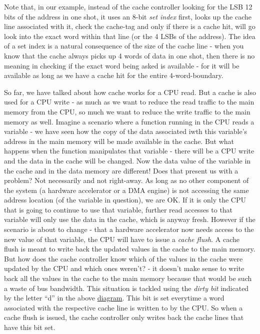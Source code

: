 Note that, in our example, instead of the cache controller looking for the LSB 12 bits of the address in one shot, it uses an 8-bit \emph{set index} first, looks up the cache line associated with it, check the cache-tag and only if there is a cache hit, will go look into the exact word within that line (or the 4 LSBs of the address). The idea of a set index is a natural consequence of the size of the cache line - when you know that the cache always picks up 4 words of data in one shot, then there is no meaning in checking if the exact word being asked is available - for it will be available as long as we have a cache hit for the entire 4-word-boundary.

So far, we have talked about how cache works for a CPU read. But a cache is also used for a CPU write - as much as we want to reduce the read traffic to the main memory from the CPU, so much we want to reduce the write traffic to the main memory as well. Imagine a scenario where a function running in the CPU reads a variable - we have seen how the copy of the data associated iwth this variable's address in the main memory will be made available in the cache. But what happens when the function manipulates that variable - there will be a CPU write and the data in the cache will be changed. Now the data value of the variable in the cache and in the data memory are different! Does that present us with a problem? Not necessarily and not right-away. As long as no other component of the system (a hardware accelerator or a DMA engine) is not accessing the same address location (of the variable in question), we are OK. If it is only the CPU that is going to continue to use that variable, further read accesses to that variable will only use the data in the cache, which is anyway fresh. However if the scenario is about to change - that a hardware accelerator now needs access to the new value of that variable, the CPU will have to issue a \emph{cache flush}. A cache flush is meant to write back the updated values in the cache to the main memory. But how does the cache controller know which of the values in the cache were updated by the CPU and which ones weren't? - it doesn't make sense to write back all the values in the cache to the main memory because that would be such a waste of bus bandwidth. This situation is tackled using the \emph{dirty bit} indicated by the letter ``d'' in the above \hyperref[fig:basicCacheOp]{diagram}. This bit is set everytime a word associated with the respective cache line is written to by the CPU. So when a cache flush is issued, the cache controller only writes back the cache lines that have this bit set.

